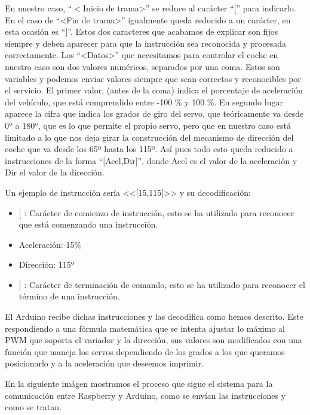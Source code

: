 \documentclass{pclass}
\begin{document}
\begin{itemize}
\begin{itemize}
	En nuestro caso, ``$<$Inicio de trama>'' se reduce al carácter ``$[$'' para indicarlo. En el caso de ``<Fin de trama>'' igualmente queda reducido a un carácter, en esta ocasión es ``$]$''. Estos dos caracteres que acabamos de explicar son fijos siempre y deben aparecer para que la instrucción sea reconocida y procesada correctamente. Los ``<Datos>'' que necesitamos para controlar el coche en nuestro caso son dos valores numéricos, separados por una coma. Estos son variables y podemos enviar valores siempre que sean correctos y reconocibles por el servicio. El primer valor, (antes de la coma) indica el porcentaje de aceleración del vehículo, que está comprendido entre -100 \% y 100 \%. En segundo lugar aparece la cifra que indica los grados de giro del servo, que teóricamente va desde 0º a 180º, que es lo que permite el propio servo, pero que en nuestro caso está limitado a lo que nos deja girar la construcción del mecanismo de dirección del coche que va desde los 65º hasta los 115º. Así pues todo esto queda reducido a instrucciones de la forma ``$[$Acel,Dir$]$'', donde Acel es el valor de la aceleración y Dir el valor de la dirección.
	
	 Un ejemplo de instrucción sería <<$[$15,115$]$>> y su decodificación:
	\begin{itemize}
		\item $[$ : Carácter de comienzo de instrucción, esto se ha utilizado para reconocer que está comenzando una instrucción.
		\item Aceleración: 15\% 
		\item Dirección: 115º
		\item $]$ : Carácter de terminación de comando, esto se ha utilizado para reconocer el término de una instrucción.
	\end{itemize}
	
	 
	

	El Arduino recibe dichas instrucciones y las decodifica como hemos descrito. Este respondiendo a una fórmula matemática que se intenta ajustar lo máximo al PWM que soporta el variador y la dirección, sus valores son modificados con una función que maneja los servos dependiendo de los grados a los que queramos posicionarlo y a la aceleración que deseemos imprimir.
	
	
	En la siguiente imágen mostramos el proceso que sigue el sistema para la comunicación entre Raspberry y Arduino, como se envían las instrucciones y como se tratan.
	

\end{itemize}
\end{itemize}
\end{document}
